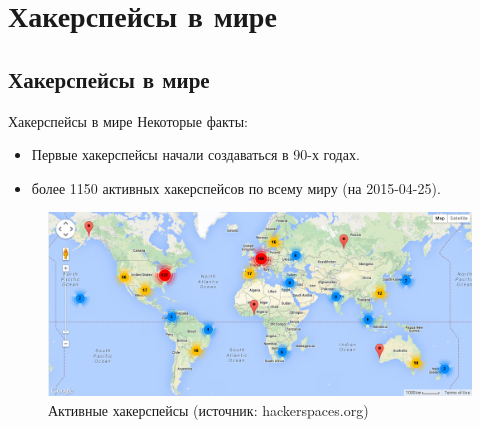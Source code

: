 \documentclass[presentation]{beamer}
\begin{document}
\section{Хакерспейсы в мире}

\subsection{Хакерспейсы в мире}

\begin{frame}[label=1-3-1]{Хакерспейсы в мире}
  Некоторые факты:
  \begin{itemize}
    \item Первые хакерспейсы начали создаваться в 90-х годах.
    \item \alert{более 1150} активных хакерспейсов по всему миру (на
      2015-04-25).
  \end{itemize}
  \begin{figure}[htb]
    \centering
    \includegraphics[width=.9\linewidth]{active-hackerspaces-2015-04-25}
    \caption{Активные хакерспейсы (источник: hackerspaces.org)}
  \end{figure}
\end{frame}
\end{document}
